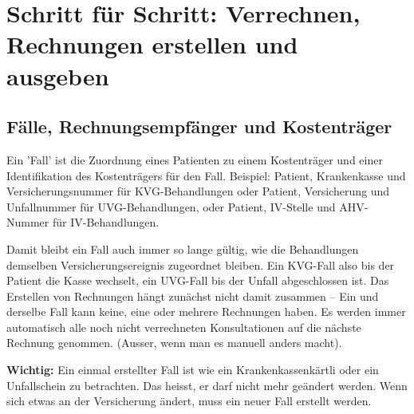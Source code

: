 \documentclass[a4paper]{scrartcl}
\begin{document}
\section{Schritt für Schritt: Verrechnen, Rechnungen erstellen und ausgeben}
\label{rechnungenerstellen}
\subsection{Fälle, Rechnungsempfänger und Kostenträger}
Ein 'Fall' ist die Zuordnung eines Patienten zu einem Kostenträger und einer Identifikation des Kostenträgers für den Fall. Beispiel: Patient, Krankenkasse und Versicherungsnummer für KVG-Behandlungen oder Patient, Versicherung und Unfallnummer für UVG-Behandlungen, oder Patient, IV-Stelle und AHV-Nummer für IV-Behandlungen.

\medskip

Damit bleibt ein Fall auch immer so lange gültig, wie die Behandlungen demselben Versicherungsereignis zugeordnet bleiben. Ein KVG-Fall also bis der Patient die Kasse wechselt, ein UVG-Fall bis der Unfall abgeschlossen ist. Das Erstellen von Rechnungen hängt zunächst nicht damit zusammen -- Ein und derselbe Fall kann keine, eine oder mehrere Rechnungen haben. Es werden immer automatisch alle noch nicht verrechneten Konsultationen auf die nächste Rechnung genommen. (Ausser, wenn man es manuell anders macht).

\medskip

\textbf{Wichtig:} Ein einmal erstellter Fall ist wie ein Krankenkassenkärtli oder ein 
 Unfallschein zu betrachten. Das heisst, er darf nicht mehr geändert werden. Wenn sich etwas an der Versicherung ändert, muss ein neuer Fall erstellt werden.
\end{document}

